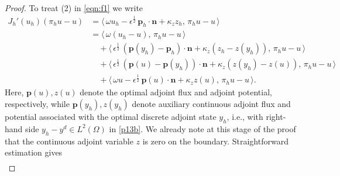 \documentclass[a4paper,10pt]{article}
\newcommand{\hF}{{\frac{1}{2}}}
\newcommand{\bp}{{\mathbf{p}}}
\newcommand{\bn}{{\mathbf{n}}}
\numberwithin{theorem}{section}
\begin{document}
\begin{proof}
To treat (2) in \eqref{eqn:f1} we write
\begin{align}\label{eqn:f5}
J_h'(u_h)(\pi_h u - u)
  &= \langle\, \omega u_h - \epsilon^{\hF} \, \bp_h \cdot \bn + \kappa_z z_h ,\, \pi_h u - u \,\rangle \nonumber \\[0.3em]
  &= \langle\, \omega (u_h-u),\, \pi_h u - u \,\rangle \nonumber\\
  &\quad
     + \langle\, \epsilon^{\hF} \, (\bp(y_h) -\bp_h)\cdot \bn 
       + \kappa_z (z_h - z(y_h)),\, \pi_h u - u \,\rangle  \nonumber\\
  &\quad
     + \langle\, \epsilon^{\hF} \, (\bp(u)-\bp(y_h))\cdot \bn
       + \kappa_z (z(y_h) - z(u)),\, \pi_h u - u \,\rangle  \nonumber\\
  &\quad
     + \langle\, \omega u -  \epsilon^{\hF} \,\bp(u)\cdot \bn + \kappa_z z(u),\, \pi_h u - u \,\rangle.
\end{align}
Here, $\bp(u),z(u)$ denote the optimal adjoint flux and adjoint potential, respectively, while $\bp(y_h),z(y_h)$ denote auxiliary continuous adjoint flux and potential associated with the optimal discrete adjoint state $y_h$, i.e., with right-hand side $y_h - y^d \in L^2(\Omega)$ in \eqref{p13b}. We already  note at this stage of the proof that the continuous adjoint variable $z$ is zero on the boundary. Straightforward estimation gives
\begin{multline}\label{extra-term}

\end{multline}
\end{proof}
\end{document}
